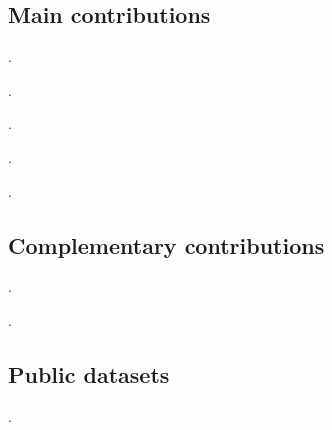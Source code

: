 \subsection{Main contributions}
\begin{description}[leftmargin=1cm,style=nextline,font=\normalfont]
\item[\cite{sousa:jfr:2023}] .
\item[\cite{sousa:icara:2024}] .
\item[\cite{sousa:icarsc:2025}] .
\item[\cite{sousa:robot:2026}] .
\item[\cite{sousa:ral:2026}] .
\end{description}
\subsection{Complementary contributions}
\begin{description}[leftmargin=1cm,style=nextline,font=\normalfont]
\item[\cite{ribeiro:access:2025}] .
\item[\cite{lopes:icara:2026}] .
\end{description}
\subsection{Public datasets}
\begin{description}[leftmargin=1cm,style=nextline,font=\normalfont]
\item[\cite{ribeiro:dataset:2025}] .
\end{description}
